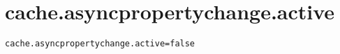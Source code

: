 \section{cache.asyncpropertychange.active}
\label{configuration:CacheAsyncpropertychangeActive}
\AvailableInJavaAndCsharp{\TODO}
\begin{lstlisting}[style=Props,caption={Usage example for \textit{cache.asyncpropertychange.active}}]
cache.asyncpropertychange.active=false
\end{lstlisting}